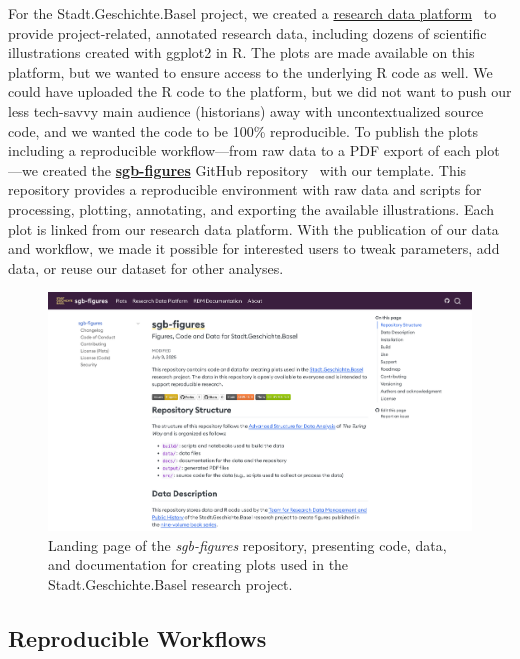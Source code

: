 \documentclass[final]{anthology-ch} %
\begin{document}
For the Stadt.Geschichte.Basel project, we created a \href{https://forschung.stadtgeschichtebasel.ch/}{research data platform}~\cite{goerlich2023} to provide project-related, annotated research data, including dozens of scientific illustrations created with ggplot2 in R. The plots are made available on this platform, but we wanted to ensure access to the underlying R code as well. We could have uploaded the R code to the platform, but we did not want to push our less tech-savvy main audience (historians) away with uncontextualized source code, and we wanted the code to be 100\% reproducible. To publish the plots including a reproducible workflow---from raw data to a PDF export of each plot---we created the \href{https://dokumentation.stadtgeschichtebasel.ch/sgb-figures}{\textbf{sgb-figures}} GitHub repository~\cite{twente2025c} with our template. This repository provides a reproducible environment with raw data and scripts for processing, plotting, annotating, and exporting the available illustrations. Each plot is linked from our research data platform. With the publication of our data and workflow, we made it possible for interested users to tweak parameters, add data, or reuse our dataset for other analyses.

\begin{figure}[t!]
  \centering
  \includegraphics[width=0.9\linewidth]{figures/dokumentation_stadtgeschichtebasel_ch_sgb_figures.png}
  \caption{Landing page of the \emph{sgb-figures} repository, presenting code, data, and documentation for creating plots used in the Stadt.Geschichte.Basel research project.}
  \label{fig-sgb-figures}
\end{figure}

\subsection{Reproducible Workflows}\label{reproducible-workflows}
\end{document}
